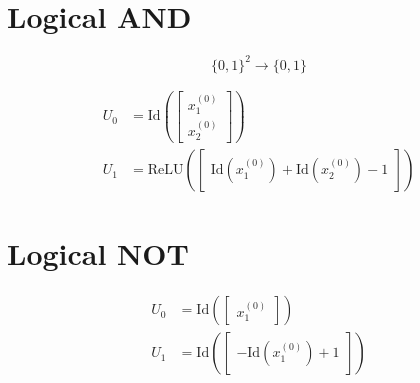 \documentclass{article}
\newcommand{\relu}{\mathrm{ReLU}}
\newcommand{\id}{\mathrm{Id}}
\newcommand{\DrawNeuron}[5]{%
  \node[neuron] (#1) at #2 {};
  \node[vect]   at ($(#1.center)+(-0.5,0)$) {#4};
  \draw         ($(#1.center)+(0.2,1.2cm)$)--($(#1.center)+(0.2,-1.2cm)$);
  \node[actlabel]at ($(#1.center)+(0.9,0)$) {#5};
  \node[above=0pt of #1] {#3};
}
\begin{document}
\section{Logical AND}
\[
  \{0,1\}^2 \to \{0,1\}
\]

\begin{align*}
  U_0 &= \id\left(
    \begin{bmatrix}
      x^{(0)}_{1} \\
      x^{(0)}_{2}
  \end{bmatrix}\right) \\
  U_1 &=\relu\left(
    \begin{bmatrix}
      \id\left( x^{(0)}_{1} \right) + \id\left( x^{(0)}_{2} \right) - 1
    \end{bmatrix}
  \right)
\end{align*}

\begin{center}
\end{center}

\section{Logical NOT}

\begin{align*}
  U_0 &= \id\left(
    \begin{bmatrix}
      x^{(0)}_{1}
  \end{bmatrix}\right) \\
  U_1 &= \id\left(
    \begin{bmatrix}
      - \id\left( x^{(0)}_{1} \right) + 1
  \end{bmatrix}\right)
\end{align*}
\end{document}
